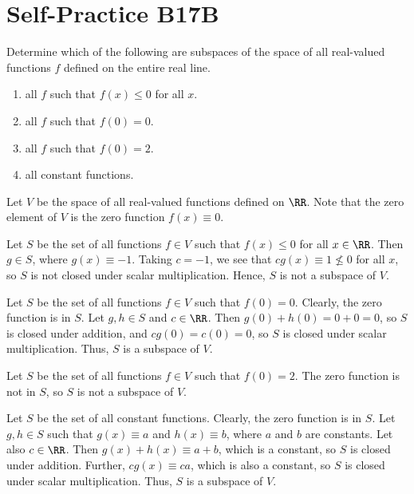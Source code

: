 \section{Self-Practice B17B}

\begin{problem}
    Determine which of the following are subspaces of the space of all real-valued functions $f$ defined on the entire real line.
    \begin{enumerate}
        \item all $f$ such that $f(x) \leq 0$ for all $x$.
        \item all $f$ such that $f(0) = 0$.
        \item all $f$ such that $f(0) = 2$.
        \item all constant functions.
    \end{enumerate}
\end{problem}
\begin{solution}
    Let $V$ be the space of all real-valued functions defined on $\RR$. Note that the zero element of $V$ is the zero function $f(x) \equiv 0$.

    \begin{ppart}
        Let $S$ be the set of all functions $f \in V$ such that $f(x) \leq 0$ for all $x \in \RR$. Then $g \in S$, where $g(x) \equiv -1$. Taking $c = -1$, we see that $cg(x) \equiv 1 \not\leq 0$ for all $x$, so $S$ is not closed under scalar multiplication. Hence, $S$ is not a subspace of $V$.
    \end{ppart}
    \begin{ppart}
        Let $S$ be the set of all functions $f \in V$ such that $f(0) = 0$. Clearly, the zero function is in $S$. Let $g, h \in S$ and $c \in \RR$. Then $g(0) + h(0) = 0 + 0 = 0$, so $S$ is closed under addition, and $cg(0) = c(0) = 0$, so $S$ is closed under scalar multiplication. Thus, $S$ is a subspace of $V$.
    \end{ppart}
    \begin{ppart}
        Let $S$ be the set of all functions $f \in V$ such that $f(0) = 2$. The zero function is not in $S$, so $S$ is not a subspace of $V$.
    \end{ppart}
    \begin{ppart}
        Let $S$ be the set of all constant functions. Clearly, the zero function is in $S$. Let $g, h \in S$ such that $g(x) \equiv a$ and $h(x) \equiv b$, where $a$ and $b$ are constants. Let also $c \in \RR$. Then $g(x) + h(x) \equiv a + b$, which is a constant, so $S$ is closed under addition. Further, $cg(x) \equiv ca$, which is also a constant, so $S$ is closed under scalar multiplication. Thus, $S$ is a subspace of $V$.
    \end{ppart}
\end{solution}

